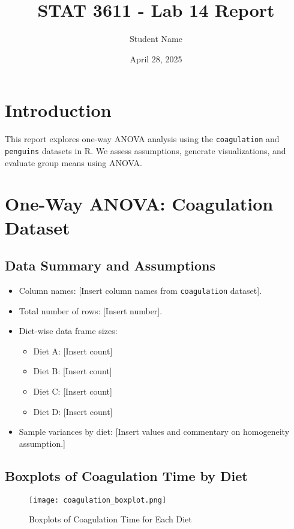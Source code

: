 \documentclass{article}
\title{STAT 3611 - Lab 14 Report}
\author{Student Name}
\date{April 28, 2025}
\begin{document}
\maketitle

\section{Introduction}
This report explores one-way ANOVA analysis using the \texttt{coagulation} and \texttt{penguins} datasets in R. We assess assumptions, generate visualizations, and evaluate group means using ANOVA.

\section{One-Way ANOVA: Coagulation Dataset}

\subsection{Data Summary and Assumptions}
\begin{itemize}
    \item Column names: [Insert column names from \texttt{coagulation} dataset].
    \item Total number of rows: [Insert number].
    \item Diet-wise data frame sizes:
    \begin{itemize}
        \item Diet A: [Insert count]
        \item Diet B: [Insert count]
        \item Diet C: [Insert count]
        \item Diet D: [Insert count]
    \end{itemize}
    \item Sample variances by diet: [Insert values and commentary on homogeneity assumption.]
\end{itemize}

\subsection{Boxplots of Coagulation Time by Diet}
\begin{figure}[H]
    \centering
    \texttt{[image: coagulation\_boxplot.png]} %
    \caption{Boxplots of Coagulation Time for Each Diet}
    \label{fig:coag_box}
\end{figure}
\end{document}
